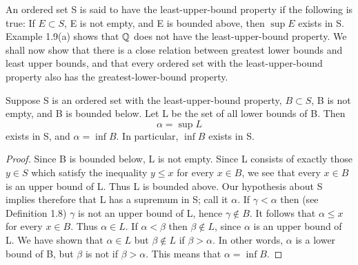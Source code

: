 \begin{definition} %
  \label{def:chap1:lub_property}
  An ordered set S is said to have the least-upper-bound property if
  the following is true:
  If $E \subset S$, E is not empty, and E is bounded above, then
  $\sup E$ exists in S.
  Example 1.9(a) shows that $\mathbb{Q}$ does not have the least-upper-bound property.
  We shall now show that there is a close relation between greatest
  lower bounds and least upper bounds, and that every ordered set
  with the least-upper-bound property also has the
  greatest-lower-bound property.
\end{definition}

\begin{theorem} %
  \label{thm:chap1:inf_exists_if_lub_property}
  Suppose S is an ordered set with the least-upper-bound property, $B
  \subset S$, B is not empty, and B is bounded below. Let L be the
  set of all lower bounds of B. Then
  \[ \alpha = \sup L \]
  exists in S, and $\alpha = \inf B$.
  In particular, $\inf B$ exists in S.
  \begin{proof}
    Since B is bounded below, L is not empty. Since L consists of
    exactly those $y \in S$ which satisfy the inequality $y \le x$
    for every $x \in B$, we see that every $x \in B$ is an upper
    bound of L. Thus L is bounded above. Our hypothesis about S
    implies therefore that L has a supremum in S; call it $\alpha$.
    If $\gamma < \alpha$ then (see Definition 1.8) $\gamma$ is not an
    upper bound of L, hence $\gamma \notin B$. It follows that
    $\alpha \le x$ for every $x \in B$. Thus $\alpha \in L$.
    If $\alpha < \beta$ then $\beta \notin L$, since $\alpha$ is an
    upper bound of L.
    We have shown that $\alpha \in L$ but $\beta \notin L$ if $\beta
    > \alpha$. In other words, $\alpha$ is a lower bound of B, but
    $\beta$ is not if $\beta > \alpha$. This means that $\alpha = \inf B$.
  \end{proof}
\end{theorem}


